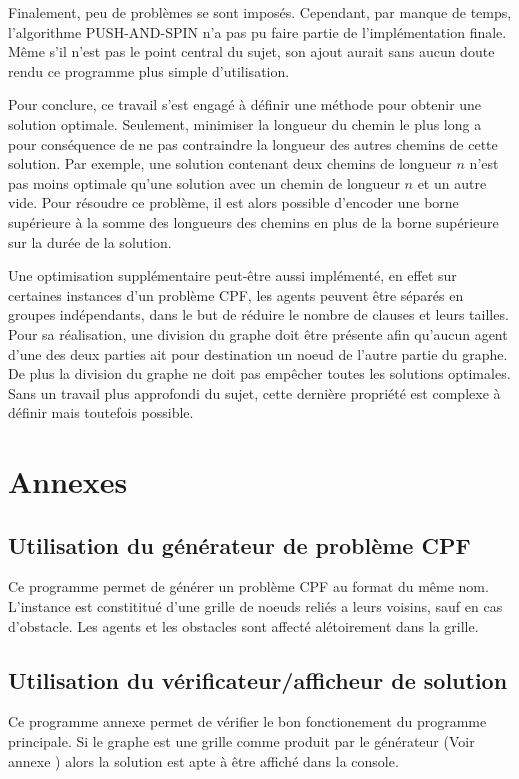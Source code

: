 \documentclass[french, 12pt, letterpaper]{article}
\theoremstyle{definition}
\theoremstyle{proposition}
\theoremstyle{example}
\begin{document}
    Finalement, peu de problèmes se sont imposés. Cependant, par manque de temps, l'algorithme PUSH-AND-SPIN \cite{PAS} n'a pas pu faire partie de
    l'implémentation finale. Même s'il n'est pas le point central du sujet, son ajout aurait sans aucun doute rendu ce programme
    plus simple d'utilisation.

    Pour conclure, ce travail s'est engagé à définir une méthode pour obtenir une solution optimale. 
    Seulement, minimiser la longueur du chemin le plus long a pour conséquence de ne pas contraindre la longueur des autres chemins
    de cette solution. Par exemple, une solution contenant deux chemins de longueur $n$ n'est pas moins optimale qu'une solution 
    avec un chemin de longueur $n$ et un autre vide. Pour résoudre ce problème, il est alors possible d'encoder une borne supérieure
    à la somme des longueurs des chemins \cite{PSURTEG} en plus de la borne supérieure sur la durée de la solution.

    Une optimisation supplémentaire peut-être aussi implémenté, en effet sur certaines instances d'un problème CPF, les agents peuvent
    être séparés en groupes indépendants, dans le but de réduire le nombre de clauses et leurs tailles.
    Pour sa réalisation, une division du graphe doit être présente afin qu'aucun agent d'une des deux parties ait pour destination
    un noeud de l'autre partie du graphe. De plus la division du graphe ne doit pas empêcher toutes les solutions optimales. 
    Sans un travail plus approfondi du sujet, cette dernière propriété est complexe à définir mais toutefois possible.
    
    \newpage
    

    \section*{Annexes}

    \subsection*{Utilisation du générateur de problème CPF}
    \label{anx:generator}

    Ce programme permet de générer un problème CPF au format du même nom.
    L'instance est constititué d'une grille de noeuds reliés a leurs voisins, sauf en cas d'obstacle.
    Les agents et les obstacles sont affecté alétoirement dans la grille.

    

    \subsection*{Utilisation du vérificateur/afficheur de solution}
    \label{anx:verifier}

    Ce programme annexe permet de vérifier le bon fonctionement du programme principale.
    Si le graphe est une grille comme produit par le générateur (Voir annexe ) alors la solution est
    apte à être affiché dans la console.

    
\end{document}

